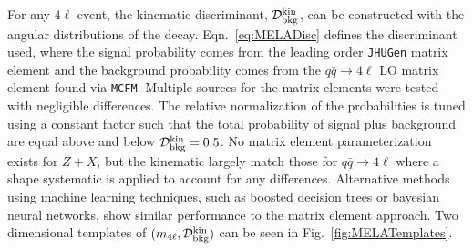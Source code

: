 For any $4\ell$ event, the kinematic discriminant, $\mathcal{D}_{\rm{bkg}}^{\rm{kin}}$, can be constructed with the angular distributions of the decay. Eqn.~\ref{eq:MELADisc} defines the discriminant used, where the signal probability comes from the leading order {\tt JHUGen} matrix element and the background probability comes from the $q\bar{q}\rightarrow 4\ell$ LO matrix element found via {\tt MCFM}. Multiple sources for the matrix elements were tested with negligible differences. The relative normalization of the probabilities is tuned using a constant factor such that the total probability of signal plus background are equal above and below $\mathcal{D}_{\rm{bkg}}^{\rm{kin}} = 0.5$. No matrix element parameterization exists for $Z+X$, but the kinematic largely match those for $q\bar{q}\rightarrow 4\ell$ where a shape systematic is applied to account for any differences. Alternative methods using machine learning techniques, such as boosted decision trees or bayesian neural networks, show similar performance to the matrix element approach. Two dimensional templates of $(m_{4\ell},\mathcal{D}_{\rm{bkg}}^{\rm{kin}})$ can be seen in Fig.~\ref{fig:MELATemplates}.

